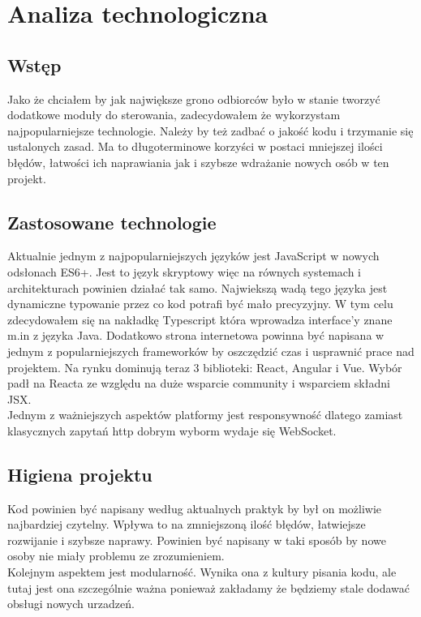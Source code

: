 \chapter{Analiza technologiczna}
\section{Wstęp}
Jako że chciałem by jak największe grono odbiorców było w stanie tworzyć dodatkowe moduły do sterowania, zadecydowałem że wykorzystam najpopularniejsze technologie. Należy by też zadbać o jakość kodu i trzymanie się ustalonych zasad. Ma to długoterminowe korzyści w postaci mniejszej ilości błędów, łatwości ich naprawiania jak i szybsze wdrażanie nowych osób w ten projekt.
\section{Zastosowane technologie}
Aktualnie jednym z najpopularniejszych języków jest JavaScript w nowych odsłonach ES6+. Jest to język skryptowy więc na równych systemach i architekturach powinien działać tak samo. Najwiekszą wadą tego języka jest dynamiczne typowanie przez co kod potrafi być mało precyzyjny. W tym celu zdecydowałem się na nakładkę Typescript która wprowadza interface'y znane m.in z języka Java. Dodatkowo strona internetowa powinna być napisana w jednym z popularniejszych frameworków by oszczędzić czas i usprawnić prace nad projektem. Na rynku dominują teraz 3 biblioteki: React, Angular i Vue. Wybór padł na Reacta ze względu na duże wsparcie community i wsparciem składni JSX. \\
Jednym z ważniejszych aspektów platformy jest responsywność dlatego zamiast klasycznych zapytań http dobrym wyborm wydaje się WebSocket. 
\section{Higiena projektu}
Kod powinien być napisany według aktualnych praktyk by był on możliwie najbardziej czytelny. Wpływa to na zmniejszoną ilość błędów, łatwiejsze rozwijanie i szybsze naprawy. Powinien być napisany w taki sposób by nowe osoby nie miały problemu ze zrozumieniem. \\
Kolejnym aspektem jest modularność. Wynika ona z kultury pisania kodu, ale tutaj jest ona szczególnie ważna ponieważ zakładamy że będziemy stale dodawać obsługi nowych urzadzeń. 
